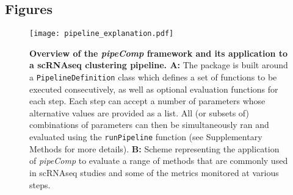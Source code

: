 \documentclass{bmcart}
\begin{document}
\begin{backmatter}




\section*{Figures}


\begin{figure}
    \centering
    \texttt{[image: pipeline\_explanation.pdf]}
    \caption{\textbf{Overview of the \textit{pipeComp} framework and its application to a scRNAseq clustering pipeline. A:} The package is built around a \texttt{PipelineDefinition} class which defines a set of functions to be executed consecutively, as well as optional evaluation functions for each step. Each step can accept a number of parameters whose alternative values are provided as a list. All (or subsets of) combinations of parameters can then be simultaneously ran and evaluated using the \texttt{runPipeline} function (see Supplementary Methods for more details). \textbf{B:} Scheme representing the application of \textit{pipeComp} to evaluate a range of methods that are commonly used in scRNAseq studies and some of the metrics monitored at various steps.}
    \label{fig:explanation}
\end{figure}



\end{backmatter}
\end{document}
